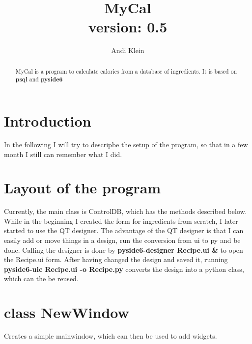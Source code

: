 \documentclass[12pt]{article}
\begin{document}
\author{ Andi Klein}
\title{ MyCal \\ 
		\bf{version: 0.5}}
\maketitle
\setcounter{secnumdepth}{10}
\setcounter{tocdepth}{10}



\newenvironment{andilist}{\begin{itemize} \em}{\end{itemize}}
\begin{abstract}
MyCal is a program to calculate calories from a database of ingredients. It is based on {\bf psql} and {\bf pyside6}
\end{abstract}
\pagebreak

\tableofcontents

\section{Introduction}
In the following I will try to descripbe the setup of the program, so that in a few month I still can remember what I did.

\section{Layout of the program}
Currently, the main class is ControlDB, which has the methods described below. While in the beginning I created the form for ingredients from scratch, I later started to use the QT designer. The advantage of the QT designer is that I can easily add or move things in a design, run the conversion from ui to py and be done.
Calling the designer is done by {\bf pyside6-designer Recipe.ui \&} to open the Recipe.ui form. After having changed the design and saved it, running {\bf pyside6-uic Recipe.ui -o Recipe.py} converts the design into a python class, which can the be reused.


\section{class NewWindow}
Creates a simple mainwindow, which can then be used to add widgets.
\end{document}
